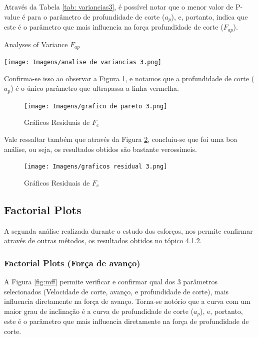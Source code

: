 \documentclass[deposito, acronym, symbols]{fei}
\begin{document}
Através da Tabela \ref{tab: variancias3}, é possível notar que o menor valor de P-value é para o parâmetro de profundidade de corte ($a_p$), e, portanto, indica que este é o parâmetro que mais influencia na força profundidade de corte ($F_{ap}$). 

\begin{table}[!htb]
 \centering
    \caption{Analyses of Variance $F_{ap}$}
    \texttt{[image: Imagens/analise de variancias 3.png]}
    \label{tab: variancias3}
 \end{table}

Confirma-se isso ao observar a Figura \ref{fig:gp3}, e notamos que a profundidade de corte ($a_p$) é o único parâmetro que ultrapassa a linha vermelha. 
  
\begin{figure}[!htp]
    \centering
    \caption{Gráficos Residuais de $F_c$}
    \texttt{[image: Imagens/grafico de pareto 3.png]}
    \label{fig:gp3}
\end{figure}

Vale ressaltar também que através da Figura \ref{fig:gr3}, concluiu-se que foi uma boa análise, ou seja, os resultados obtidos são bastante verossímeis.

\begin{figure}[!htp]
    \centering
    \caption{Gráficos Residuais de $F_c$}
    \texttt{[image: Imagens/graficos residual 3.png]}
    \label{fig:gr3}
\end{figure}

\subsection{Factorial Plots}

A segunda análise realizada durante o estudo dos esforços, nos permite confirmar através de outras métodos, os resultados obtidos no tópico 4.1.2.

\subsubsection{Factorial Plots (Força de avanço)}

A Figura \ref{fig:mff}  permite verificar e confirmar qual dos 3 parâmetros selecionados (Velocidade de corte, avanço, e profundidade de corte), mais influencia diretamente na força de avanço. Torna-se notório que a curva com um maior grau de inclinação é a curva de profundidade de corte ($a_p$), e, portanto, este é o parâmetro que mais influencia diretamente na força de profundidade de corte. 
\end{document}
